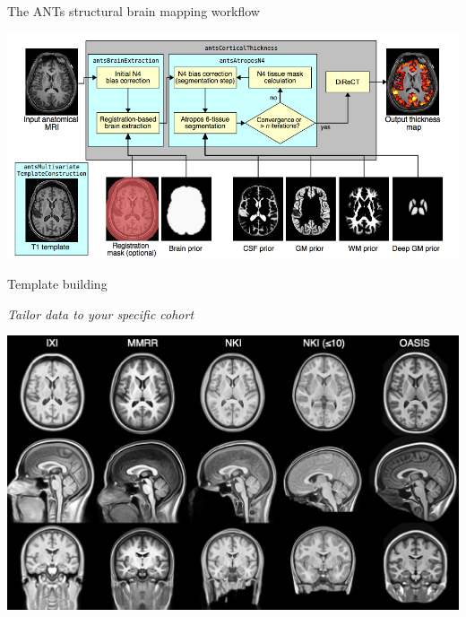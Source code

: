 \documentclass[ignorenonframetext,]{beamer}
\begin{document}
\begin{frame}{The ANTs structural brain mapping workflow}

\includegraphics{./evaluation/figures/pipeline.png}

\end{frame}

\begin{frame}{Template building}

\emph{Tailor data to your specific cohort}

\includegraphics{./evaluation/figures/templates.png}

\end{frame}
\end{document}
